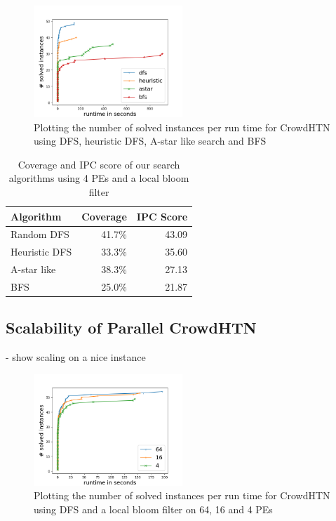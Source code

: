\begin{figure}
	\caption{Plotting the number of solved instances per run time for CrowdHTN using DFS, heuristic DFS, A-star like search and BFS}
	\label{figure: eval algorithm}
	\centering
	\includegraphics[width=0.5\textwidth]{images/final/search_algorithms.png}
\end{figure}
\begin{table}
	\caption{Coverage and IPC score of our search algorithms using 4 PEs and a local bloom filter}
	\label{table: eval algorithm}
	\centering
	\begin{tabular}{| l | r | r |}
		\hline
		Algorithm 		& Coverage & IPC Score \\
		\hline
		Random DFS 		& 41.7\%	& 43.09 \\ %
		Heuristic DFS 	& 33.3\%	& 35.60	\\ %
		A-star like 	& 38.3\%	& 27.13 \\ %
		BFS 			& 25.0\%	& 21.87	\\ %
		\hline
	\end{tabular}
\end{table}

\subsection{Scalability of Parallel CrowdHTN}
\label{eval: scalability}
- show scaling on a nice instance

\begin{figure}
	\caption{Plotting the number of solved instances per run time for CrowdHTN using DFS and a local bloom filter on 64, 16 and 4 PEs}
	\label{figure: eval scalability}
	\centering
	\includegraphics[width=0.5\textwidth]{images/final/scalability}
\end{figure}

